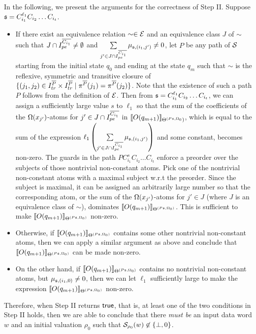 \smallskip
In the following, we present the arguments for the correctness of Step II. Suppose ${\mathfrak{s} } =C_{i_1}^{\ell_1} C_{i_2} \dots C_{i_t}$.
\begin{itemize}
\item If there exist an equivalence relation $\sim \in {\mathcal{E} }$ and an equivalence class $J$ of $\sim$ such that $J \cap I^{\overline{C_{i_1}}}_{pe} \neq \emptyset$ and 
$\sum \limits_{j' \in  J \cap I^{\overline{C_{i_1}}}_{pe}} \mu_{{\mathfrak{s} },(i_1,j')} \neq 0$, let $P$ be any path of ${\mathcal{S} }$ starting from the initial state $q_0$ and ending at the state $q_m$ such that $\sim$ is the reflexive, symmetric and transitive closure of $\{(j_1, j_2) \in I^{\overline{P}}_{tr} \times I^{\overline{P}}_{tr} \mid  \pi^{\overline{P}}(j_1) = \pi^{\overline{P}}(j_2)\}$. Note that the existence of such a path $P$ follows from the definition of ${\mathcal{E} }$. 
Then from ${\mathfrak{s} }=C_{i_1}^{\ell_1} C_{i_2} \dots C_{i_t}$, we can assign a sufficiently large value $s$ to $\ell_1$ so that the sum of the coefficients of the $\Omega(x_{j'})$-atoms for $j' \in  J \cap I^{\overline{C_{i_1}}}_{pe}$ in $\llbracket O(q_{m+1})\rrbracket_{\Theta^{(P{\mathfrak{s} } ,\Omega_0})}$, which is equal to the sum of the expression $\ell_1 \left(\sum \limits_{j' \in  J \cap I^{\overline{C_{i_1}}}_{pe}} \mu_{{\mathfrak{s} },(i_1,j')}\right)$ and some constant,  becomes non-zero.  The guards in the path $P C_{i_1}^{s} C_{i_2} \dots C_{i_t}$ enforce a preorder over the subjects of those nontrivial non-constant atoms.
Pick one of the nontrivial non-constant atoms with a maximal subject w.r.t the preorder. Since the subject is maximal, it can be assigned an arbitrarily large number so that the corresponding atom, or the sum of the $\Omega(x_{j'})$-atoms for $j' \in J$ (where $J$ is an equivalence class of $\sim$), dominates $\llbracket O(q_{m+1})\rrbracket_{\Theta^{(P{\mathfrak{s} },\Omega_0)}}$.  This is sufficient to make $\llbracket O(q_{m+1})\rrbracket_{\Theta^{(P{\mathfrak{s} },\Omega_0)}}$ non-zero.
%
\item Otherwise, if $\llbracket O(q_{m+1})\rrbracket_{\Theta^{(P{\mathfrak{s} },\Omega_0)}}$ contains some other nontrivial non-constant atoms, then we can apply a similar argument as above and conclude that $\llbracket O(q_{m+1})\rrbracket_{\Theta^{(P{\mathfrak{s} },\Omega_0)}}$ can be made non-zero. 

\item On the other hand, if $\llbracket O(q_{m+1})\rrbracket_{\Theta^{(P{\mathfrak{s} },\Omega_0)}}$ contains no nontrivial non-constant atoms, but $\mu_{{\mathfrak{s} },(i_1,0)} \neq 0$, then we can let $\ell_1$ sufficiently large to make the expression $\llbracket O(q_{m+1})\rrbracket_{\Theta^{(P{\mathfrak{s} },\Omega_0)}}$ non-zero. 
\end{itemize} 
Therefore, when Step II returns $\mathsf{true}$, that is, at least one of the two conditions in Step II holds, then we are able to conclude that there \emph{must be}  an input data word $w$ and an initial valuation $\rho_0$ such that $ {\mathcal{S} }_{\rho_0}(w) \not \in \{\bot, 0\}$. 

